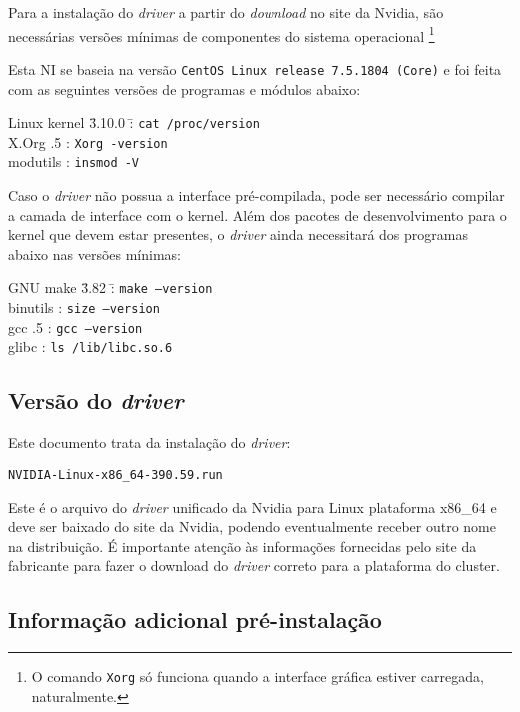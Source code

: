 \documentclass[twoside,a4paper,12pt,english]{inac17}
\begin{document}
Para a instalação do \textit{driver} a partir do \textit{download} 
no site da Nvidia, são necessárias versões mínimas de componentes 
do sistema operacional \footnote{O comando \texttt{Xorg} só funciona 
quando a interface gráfica estiver carregada, naturalmente.} 

Esta NI se baseia na versão \texttt{CentOS Linux release 7.5.1804 (Core)} 
e foi feita com as seguintes versões de programas e módulos abaixo:

\begin{tabbing}
Linux kernel \= 3.10.0 \= : \= \texttt{cat /proc/version} \\
X.Org .5 \> : \> \texttt{Xorg -version} \\
modutils  \> : \> \texttt{insmod -V}
\end{tabbing}

Caso o \textit{driver} não possua a interface pré-compilada, pode ser necessário 
compilar a camada de interface com o kernel. Além dos pacotes de desenvolvimento 
para o kernel que devem estar presentes, o \textit{driver} ainda necessitará dos 
programas abaixo nas versões mínimas:

\begin{tabbing}
GNU make	 \= 3.82	\= : \= \texttt{make --version} \\
binutils	 	\> : \> \texttt{size --version} \\
gcc 		 .5	\> : \> \texttt{gcc --version} \\
glibc	 	\> : \> \texttt{ls /lib/libc.so.6}\\
\end{tabbing}


\subsection{Versão do \textit{driver}}

Este documento trata da instalação do \textit{driver}:

\texttt{NVIDIA-Linux-x86\_64-390.59.run}

Este é o arquivo do \textit{driver} unificado da Nvidia para 
Linux plataforma x86\_64 e deve ser baixado do site da Nvidia, podendo  eventualmente receber outro nome na distribuição. É importante 
atenção às informações fornecidas pelo site da fabricante para 
fazer o download do \textit{driver} correto para a plataforma 
do cluster.

\subsection{Informação adicional pré-instalação}
\end{document}

